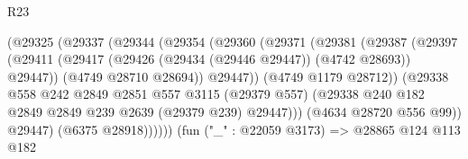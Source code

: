 \begin{lexlean}{R23}
\begin{coremodule}
                                        (@29325
                                          (@29337
                                            (@29344
                                              (@29354
                                                (@29360
                                                  (@29371
                                                    (@29381
                                                      (@29387
                                                        (@29397
                                                          (@29411
                                                            (@29417
                                                              (@29426
                                                                (@29434 (@29446 @29447))
                                                                (@4742 @28693))
                                                              @29447))
                                                          (@4749 @28710 @28694))
                                                        @29447))
                                                    (@4749 @1179 @28712))
                                                  (@29338
                                                    @558
                                                    @242
                                                    @2849
                                                    @2851
                                                    @557
                                                    @3115
                                                    (@29379 @557)
                                                    (@29338
                                                      @240
                                                      @182
                                                      @2849
                                                      @2849
                                                      @239
                                                      @2639
                                                      (@29379 @239)
                                                      @29447)))
                                                (@4634 @28720 @556 @99))
                                              @29447)
                                            (@6375 @28918))))))
                                  (fun ("_" : @22059 @3173) =>
                                  @28865
                                    @124
                                    @113
                                    @182

\end{coremodule}
\end{lexlean}
